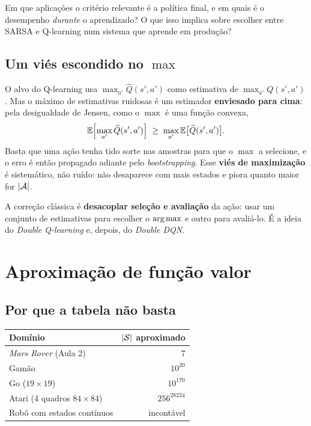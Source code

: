 \documentclass[11pt]{article}
\newcommand{\Qhat}{\widehat{Q}}
\begin{document}
\begin{discbox}
  Em que aplicações o critério relevante é a política final, e em quais é o
  desempenho \emph{durante} o aprendizado? O que isso implica sobre escolher
  entre SARSA e Q-learning num sistema que aprende em produção?
\end{discbox}

\subsection{Um viés escondido no \texorpdfstring{$\max$}{max}}

O alvo do Q-learning usa $\max_{a'} \Qhat(s',a')$ como estimativa de
$\max_{a'} Q(s',a')$. Mas o máximo de estimativas ruidosas é um estimador
\textbf{enviesado para cima}: pela desigualdade de Jensen, como o $\max$ é uma
função convexa,
\[ \E\Bigl[\max_{a'} \Qhat(s',a')\Bigr] \;\ge\; \max_{a'} \E\bigl[\Qhat(s',a')\bigr]. \]
Basta que uma ação tenha tido sorte nas amostras para que o $\max$ a selecione,
e o erro é então propagado adiante pelo \emph{bootstrapping}. Esse
\textbf{viés de maximização} é sistemático, não ruído: não desaparece com mais
estados e piora quanto maior for $\lvert\mathcal{A}\rvert$.

\begin{ideiabox}
  A correção clássica é \textbf{desacoplar seleção e avaliação} da ação: usar um
  conjunto de estimativas para escolher o $\operatorname*{arg\,max}$ e outro para avaliá-lo. É a
  ideia do \emph{Double Q-learning} e, depois, do \emph{Double DQN}.
\end{ideiabox}

\section{Aproximação de função valor}

\subsection{Por que a tabela não basta}

\begin{center}\small
\begin{tabular}{lr}
  \toprule
  Domínio & $\lvert\mathcal{S}\rvert$ aproximado \\
  \midrule
  \emph{Mars Rover} (Aula 2)        & $7$ \\
  Gamão                             & $10^{20}$ \\
  Go ($19 \times 19$)               & $10^{170}$ \\
  Atari (4 quadros $84\times84$)    & $256^{28224}$ \\
  Robô com estados contínuos        & incontável \\
  \bottomrule
\end{tabular}
\end{center}
\end{document}
